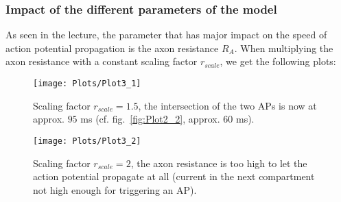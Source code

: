\documentclass[
a4paper, 
12pt, 
]{article}
\begin{document}
	\subsubsection{Impact of the different parameters of the model}
	As seen in the lecture, the parameter that has major impact on the speed of action potential propagation is the axon resistance $R_A$. When multiplying the axon resistance with a constant scaling factor $r_{scale}$, we get the following plots:
	\begin{figure}[h]
\centering
\texttt{[image: Plots/Plot3\_1]}
\caption{Scaling factor $r_{scale} = 1.5$, the intersection of the two APs is now at approx. $95$ ms (cf. fig.~\ref{fig:Plot2_2}, approx. $60$ ms). }
\label{fig:Plot3_1}
\end{figure}
	\begin{figure}[h]
		\centering
		\texttt{[image: Plots/Plot3\_2]}
		\caption{Scaling factor $r_{scale} = 2$, the axon resistance is too high to let the action potential propagate at all (current in the next compartment not high enough for triggering an AP).}
		\label{fig:Plot3_2}
	\end{figure}


	


	

	
	
\end{document}
